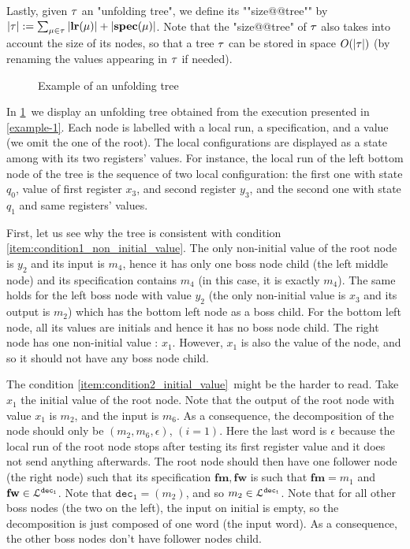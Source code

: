 Lastly, given $\tau$ an "unfolding tree", we define its ""size@@tree"" by $|\tau| := \sum_{\mu \in \tau} |\mathbf{lr}(\mu)| + |\mathbf{spec}(\mu)|$. Note that the "size@@tree" of $\tau$ also takes into account the size of its nodes, so that a tree $\tau$ can be stored in space $O(|\tau|)$ (by renaming the values appearing in $\tau$ if needed). 
\begin{figure}
	\begin{center}
		
	\end{center}
	\caption{Example of an unfolding tree}\label{fig-ex-unfolding-tree}
\end{figure}

\begin{example}
	In \cref{fig-ex-unfolding-tree}~we display an unfolding tree obtained from the execution presented in \cref{example-1}. Each node is labelled with a local run, a specification, and a value (we omit the one of the root). The local configurations are displayed as a state among with its two registers' values. For instance, the local run of the left bottom node of the tree is the sequence of two local configuration: the first one with state $q_0$, value of first register $x_3$, and second register $y_3$, and the second one with state $q_1$ and same registers' values.
	
	First, let us see why the tree is consistent with condition \ref{item:condition1_non_initial_value}.
	The only non-initial value of the root node is $y_2$ and its input is $m_4$, hence it has only one boss node child (the left middle node) and its specification contains $m_4$ (in this case, it is exactly $m_4$). The same holds for the left boss node with value $y_2$ (the only non-initial value is $x_3$ and its output is $m_2$) which has the bottom left node as a boss child. For the bottom left node, all its values are initials and hence it has no boss node child. The right node has one non-initial value : $x_1$. However, $x_1$ is also the value of the node, and so it should not have any boss node child. 
	
	The condition \ref{item:condition2_initial_value}~might be the harder to read. Take $x_1$ the initial value of the root node. Note that the output of the root node with value $x_1$ is $m_2$, and the input is $m_6$. As a consequence, the decomposition of the node should only be $(m_2, m_6, \epsilon)$, $(i = 1)$. Here the last word is $\epsilon$ because the local run of the root node stops after testing its first register value and it does not send anything afterwards. The root node should then have one follower node (the right node) such that its specification $\mathbf{fm}, \mathbf{fw}$ is such that $\mathbf{fm} = m_1$ and $\mathbf{fw} \in \mathcal{L}^{\mathtt{dec_1}}$. Note that $\mathtt{dec_1} = (m_2)$, and so $m_2 \in \mathcal{L}^{\mathtt{dec_1}}$. Note that for all other boss nodes (the two on the left), the input on initial is empty, so the decomposition is just composed of one word (the input word). As a consequence, the other boss nodes don't have follower nodes child.
	

\end{example}
